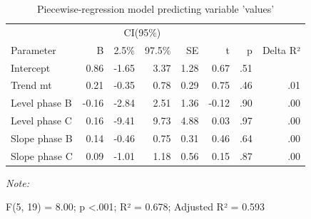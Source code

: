 \documentclass[
]{book}
\begin{document}
\begin{table}[!h]

\caption{\label{tab:plm-strange-study}Piecewise-regression model predicting variable 'values'}
\begin{threeparttable}
\begin{tabular}[t]{lrrrrrrr}
\toprule
\multicolumn{2}{c}{ } & \multicolumn{2}{c}{CI(95\%)} & \multicolumn{4}{c}{ } \\
\cmidrule(l{3pt}r{3pt}){3-4}
Parameter & B & 2.5\% & 97.5\% & SE & t & p & Delta R²\\
\midrule
Intercept & 0.86 & -1.65 & 3.37 & 1.28 & 0.67 & .51 & \\
Trend mt & 0.21 & -0.35 & 0.78 & 0.29 & 0.75 & .46 & .01\\
Level phase B & -0.16 & -2.84 & 2.51 & 1.36 & -0.12 & .90 & .00\\
Level phase C & 0.16 & -9.41 & 9.73 & 4.88 & 0.03 & .97 & .00\\
Slope phase B & 0.14 & -0.46 & 0.75 & 0.31 & 0.46 & .64 & .00\\
Slope phase C & 0.09 & -1.01 & 1.18 & 0.56 & 0.15 & .87 & .00\\
\bottomrule
\end{tabular}
\begin{tablenotes}
\item \textit{Note: } 
\item F(5, 19) = 8.00; p <.001; R² = 0.678; Adjusted R² = 0.593
\end{tablenotes}
\end{threeparttable}
\end{table}
\end{document}
